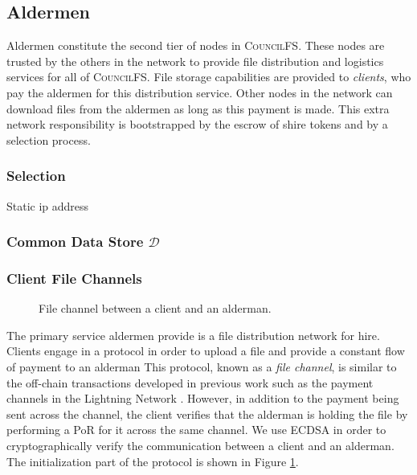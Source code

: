 \documentclass{article}
\begin{document}
\subsection{Aldermen}

Aldermen constitute the second tier of nodes in \textsc{CouncilFS}. These nodes
are trusted by the others in the network to provide file distribution and
logistics services for all of \textsc{CouncilFS}. File storage capabilities are
provided to \emph{clients}, who pay the aldermen for this distribution service.
Other nodes in the network can download files from the aldermen as long as this
payment is made. This extra network responsibility is bootstrapped by the escrow
of shire tokens and by a selection process.

\subsubsection{Selection}

Static ip address

\subsubsection{Common Data Store $\mathcal{D}$}

\subsubsection{Client File Channels}

\begin{figure}[t]
  \centering
  \fbox{\rule[-.5cm]{4cm}{4cm} \rule[-.5cm]{4cm}{0cm}}
  \caption{File channel between a client and an alderman.}
  \label{fig:channel}
\end{figure}

The primary service aldermen provide is a file distribution network for hire.
Clients engage in a protocol in order to upload a file and provide a constant
flow of payment to an alderman This
protocol, known as a \emph{file channel}, is similar to the off-chain
transactions developed in previous work such as the payment channels in the
Lightning Network \cite{lightning}. However, in addition to the payment being
sent across the channel, the client verifies that the alderman is holding the
file by performing a PoR for it across the same channel. We use ECDSA in order
to cryptographically verify the communication between a client and an alderman.
The initialization part of the protocol is shown in Figure \ref{fig:channel}.
\end{document}

